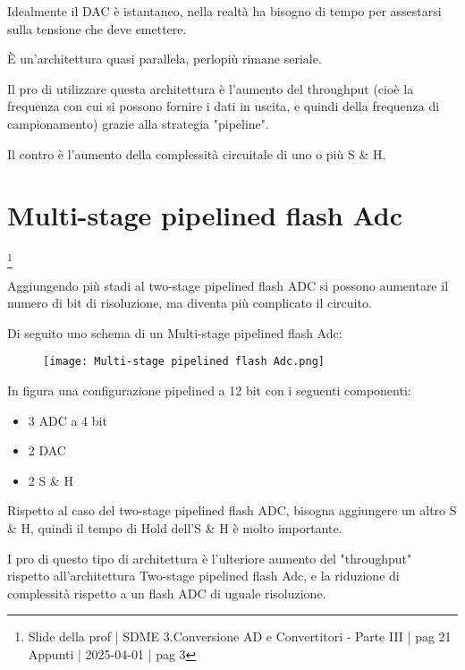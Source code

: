 Idealmente il DAC è istantaneo, nella realtà ha bisogno di tempo per assestarsi sulla tensione che deve emettere. \newline 

È un'architettura quasi parallela, perlopiù rimane seriale. \newline 

Il pro di utilizzare questa architettura è l'aumento del throughput (cioè la frequenza con cui si possono fornire i dati in uscita, e quindi della frequenza di campionamento) 
grazie alla strategia "pipeline". \newline 

Il contro è l'aumento della complessità circuitale di uno o più S \& H. \newline  


\newpage

\section{Multi-stage pipelined flash Adc}
\footnote{Slide della prof | SDME 3.Conversione AD e Convertitori - Parte III | pag 21 \\  
Appunti | 2025-04-01 | pag 3}

Aggiungendo più stadi al two-stage pipelined flash ADC si possono aumentare il numero di bit di risoluzione, ma diventa più complicato il circuito. \newline 

Di seguito uno schema di un Multi-stage pipelined flash Adc: 

\begin{figure}[h]
    \centering
    \texttt{[image: Multi-stage pipelined flash Adc.png]}
\end{figure}

In figura una configurazione pipelined a 12 bit con i seguenti componenti: 

\begin{itemize}
    \item 3 ADC a 4 bit 
    \item 2 DAC 
    \item 2 S \& H
\end{itemize}

Rispetto al caso del two-stage pipelined flash ADC, bisogna aggiungere un altro S \& H, quindi il tempo di Hold dell'S \& H 
è molto importante. \newline 

I pro di questo tipo di architettura è l'ulteriore aumento del "throughput" rispetto all'architettura Two-stage pipelined flash Adc, 
e la riduzione di complessità rispetto a un flash ADC di uguale risoluzione. \newline 


